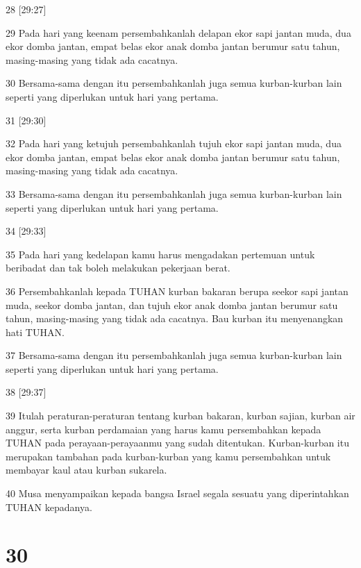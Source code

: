 \par 28 [29:27]
\par 29 Pada hari yang keenam persembahkanlah delapan ekor sapi jantan muda, dua ekor domba jantan, empat belas ekor anak domba jantan berumur satu tahun, masing-masing yang tidak ada cacatnya.
\par 30 Bersama-sama dengan itu persembahkanlah juga semua kurban-kurban lain seperti yang diperlukan untuk hari yang pertama.
\par 31 [29:30]
\par 32 Pada hari yang ketujuh persembahkanlah tujuh ekor sapi jantan muda, dua ekor domba jantan, empat belas ekor anak domba jantan berumur satu tahun, masing-masing yang tidak ada cacatnya.
\par 33 Bersama-sama dengan itu persembahkanlah juga semua kurban-kurban lain seperti yang diperlukan untuk hari yang pertama.
\par 34 [29:33]
\par 35 Pada hari yang kedelapan kamu harus mengadakan pertemuan untuk beribadat dan tak boleh melakukan pekerjaan berat.
\par 36 Persembahkanlah kepada TUHAN kurban bakaran berupa seekor sapi jantan muda, seekor domba jantan, dan tujuh ekor anak domba jantan berumur satu tahun, masing-masing yang tidak ada cacatnya. Bau kurban itu menyenangkan hati TUHAN.
\par 37 Bersama-sama dengan itu persembahkanlah juga semua kurban-kurban lain seperti yang diperlukan untuk hari yang pertama.
\par 38 [29:37]
\par 39 Itulah peraturan-peraturan tentang kurban bakaran, kurban sajian, kurban air anggur, serta kurban perdamaian yang harus kamu persembahkan kepada TUHAN pada perayaan-perayaanmu yang sudah ditentukan. Kurban-kurban itu merupakan tambahan pada kurban-kurban yang kamu persembahkan untuk membayar kaul atau kurban sukarela.
\par 40 Musa menyampaikan kepada bangsa Israel segala sesuatu yang diperintahkan TUHAN kepadanya.

\chapter{30}

